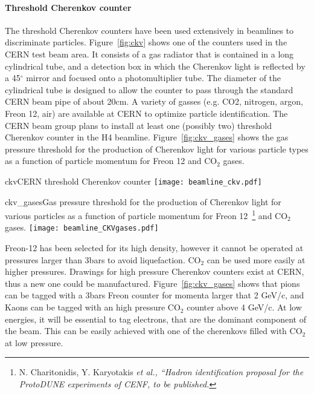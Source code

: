 \paragraph{Threshold Cherenkov counter}
The threshold Cherenkov counters have been used extensively in beamlines to discriminate particles. Figure~\ref{fig:ckv} shows one of the counters used in the CERN test beam area. It consists of a gas radiator that is contained in a long cylindrical tube, and a detection box in which the Cherenkov light is reflected by a 45$^\circ$ mirror and focused onto a photomultiplier tube. The diameter of the cylindrical tube is designed to allow the counter to pass through the standard CERN beam pipe of about 20cm. A variety of gasses (e.g. CO2, nitrogen, argon, Freon 12, air) are available at CERN to optimize particle identification. The CERN beam group plans to install at least one (possibly two) threshold Cherenkov counter in the H4 beamline. 
Figure~\ref{fig:ckv_gases} shows the gas pressure threshold 
for the production of Cherenkov light for various particle types as a function of particle momentum for Freon 12 and CO$_2$ gases.
\begin{cdrfigure}{ckv}{CERN threshold Cherenkov counter}
  \texttt{[image: beamline\_ckv.pdf]}
\end{cdrfigure}
\begin{cdrfigure}{ckv_gases}{Gas pressure threshold for the production of Cherenkov light for various particles as a function of particle momentum for Freon 12~\footnote{N. Charitonidis, Y. Karyotakis \it{et al.}, ``Hadron identification proposal for the ProtoDUNE experiments of CENF, to be published.} and CO$_2$ gases.}
  \texttt{[image: beamline\_CKVgases.pdf]}
\end{cdrfigure}
Freon-12 has been selected for its high density, however it cannot be operated at pressures larger than 3bars to avoid liquefaction.  CO$_2$ can be used more easily at higher pressures.  Drawings for high pressure Cherenkov counters exist at CERN, thus a new one could be manufactured. 
 Figure~\ref{fig:ckv_gases} shows that pions can be tagged with a 3bars Freon counter for momenta larger that 2 GeV/c, and Kaons can be tagged with an high pressure  CO$_2$  counter above 4 GeV/c. 
At low energies, it will be essential  to tag electrons, that are the dominant component of the beam. This can be easily achieved with one   of the cherenkovs filled with CO$_2$ at low pressure.

